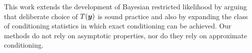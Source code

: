 \documentclass[ba]{imsart}
\def\bth{\mbox{\boldmath $\theta$}}
\newcommand{\by}{\mbox{\boldmath $y$}}
\newcommand{\green}[1]{{\color{green}#1}}
\begin{document}


This work extends the development of Bayesian restricted likelihood by arguing that deliberate choice of $T(\by)$ is sound practice and also by expanding the class of conditioning statistics in which exact conditioning can be achieved.  Our methods do not rely on asymptotic properties, nor do they rely on approximate conditioning.%

\end{document}
